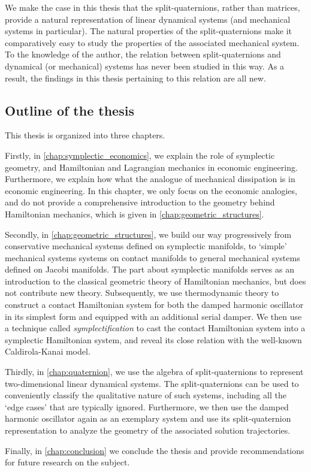 We make the case in this thesis that the split-quaternions, rather than matrices, provide a natural representation of linear dynamical systems (and mechanical systems in particular). The natural properties of the split-quaternions make it comparatively easy to study the properties of the associated mechanical system. To the knowledge of the author, the relation between split-quaternions and dynamical (or mechanical) systems has never been studied in this way. As a result, the findings in this thesis pertaining to this relation are all new.

\subsection*{Outline of the thesis}
This thesis is organized into three chapters. 

Firstly, in \cref{chap:symplectic_economics}, we explain the role of symplectic geometry, and Hamiltonian and Lagrangian mechanics in economic engineering. Furthermore, we explain how what the analogue of mechanical dissipation is in economic engineering. In this chapter, we only focus on the economic analogies, and do not provide a comprehensive introduction to the geometry behind Hamiltonian mechanics, which is given in \cref{chap:geometric_structures}. %

Secondly, in \cref{chap:geometric_structures}, we build our way progressively from conservative mechanical systems defined on symplectic manifolds, to `simple' mechanical systems systems on contact manifolds to general mechanical systems defined on Jacobi manifolds. The part about symplectic manifolds serves as an introduction to the classical geometric theory of Hamiltonian mechanics, but does not contribute new theory. Subsequently, we use thermodynamic theory to construct a contact Hamiltonian system for both the damped harmonic oscillator in its simplest form and equipped with an additional serial damper. We then use a technique called \emph{symplectification} to cast the contact Hamiltonian system into a symplectic Hamiltonian system, and reveal its close relation with the well-known Caldirola-Kanai model.

Thirdly, in \cref{chap:quaternion}, we use the algebra of split-quaternions to represent two-dimensional linear dynamical systems. The split-quaternions can be used to conveniently classify the qualitative nature of such systems, including all the `edge cases' that are typically ignored. Furthermore, we then use the damped harmonic oscillator again as an exemplary system and use its split-quaternion representation to analyze the geometry of the associated solution trajectories.

Finally, in \cref{chap:conclusion} we conclude the thesis and provide recommendations for future research on the subject.


